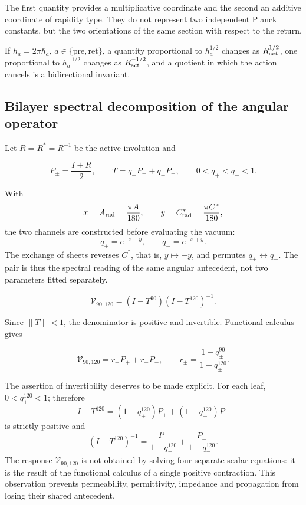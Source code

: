 The first quantity provides a multiplicative coordinate and the second
an additive coordinate of rapidity type. They do not represent two independent
Planck constants, but the two orientations of the same section
with respect to the return.

If \(h_a=2\pi\hbar_a\), \(a\in\{\mathrm{pre},\mathrm{ret}\}\), a quantity proportional to \(h_a^{1/2}\) changes as \(R_{\rm act}^{1/2}\), one proportional to \(h_a^{-1/2}\) changes as \(R_{\rm act}^{-1/2}\), and a quotient in which the action cancels is a bidirectional invariant.

\subsection{Bilayer spectral decomposition of the angular operator}

Let \(R=R^*=R^{-1}\) be the active involution and

\[
P_\pm=\frac{I\pm R}{2},
\qquad
T=q_+P_+ +q_-P_-,
\qquad 0<q_+<q_-<1.
\]

With
\[
x=A_{\rm rad}=\frac{\pi A}{180},\qquad
y=C^*_{\rm rad}=\frac{\pi C^*}{180},
\]
the two channels are constructed before evaluating the vacuum:
\begin{equation}
q_+=e^{-x-y},\qquad q_-=e^{-x+y}.
\label{rm:eq:vacuum-angular-channels}
\end{equation}
The exchange of sheets reverses \(C^*\), that is, \(y\mapsto-y\), and permutes \(q_+\leftrightarrow q_-\). The pair is thus the spectral reading of the same angular antecedent, not two parameters fitted separately.

\begin{definition}
\begin{equation}
\mathcal V_{90,120}=(I-T^{90})(I-T^{120})^{-1}.
\label{rm:eq:vacuum-operator}
\end{equation}
\end{definition}

Since \(\|T\|<1\), the denominator is positive and invertible. Functional calculus gives

\begin{equation}
\mathcal V_{90,120}=r_+P_+ +r_-P_-,
\qquad
r_\pm=\frac{1-q_\pm^{90}}{1-q_\pm^{120}}.
\label{rm:eq:vacuum-eigenvalues}
\end{equation}

The assertion of invertibility deserves to be made explicit. For each leaf,
\(0<q_\pm^{120}<1\); therefore
\[
I-T^{120}=(1-q_+^{120})P_++(1-q_-^{120})P_-
\]
is strictly positive and
\[
(I-T^{120})^{-1}
=\frac{P_+}{1-q_+^{120}}+
 \frac{P_-}{1-q_-^{120}}.
\]
The response \(\mathcal V_{90,120}\) is not obtained by solving four
separate scalar equations: it is the result of the functional calculus of a
single positive contraction. This observation prevents permeability,
permittivity, impedance and propagation from losing their shared antecedent.

